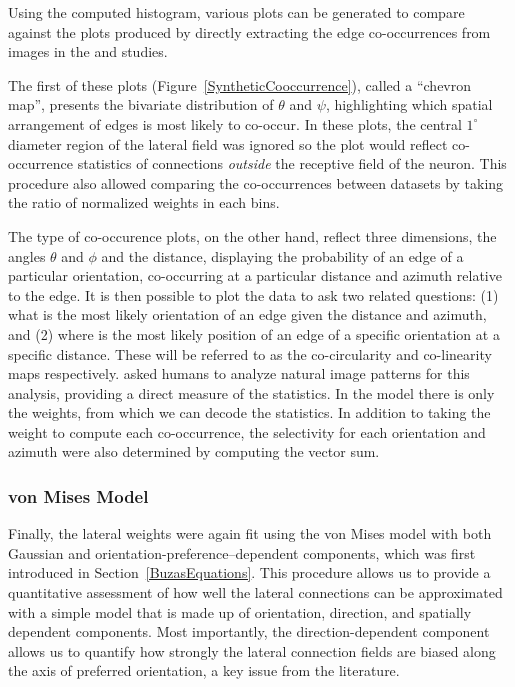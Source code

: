 Using the computed histogram, various plots can be generated to
compare against the plots produced by directly extracting the edge
co-occurrences from images in the \cite{Perrinet2015} and
\cite{Geisler2001} studies.

The first of these plots (Figure~\ref{SyntheticCooccurrence}), called
a ``chevron map'', presents the bivariate distribution of $\theta$ and
$\psi$, highlighting which spatial arrangement of edges is most likely
to co-occur. In these plots, the central $1^\circ$ diameter region of
the lateral field was ignored so the plot would reflect co-occurrence
statistics of connections \emph{outside} the receptive field of the
neuron. This procedure also allowed comparing the co-occurrences between
datasets by taking the ratio of normalized weights in each bins.

The \cite{Geisler2001} type of co-occurence plots, on the other hand,
reflect three dimensions, the angles $\theta$ and $\phi$ and the
distance, displaying the probability of an edge of a particular
orientation, co-occurring at a particular distance and azimuth
relative to the edge. It is then possible to plot the data to ask
two related questions: (1) what is the most likely orientation of an
edge given the distance and azimuth, and (2) where is the most likely
position of an edge of a specific orientation at a specific
distance. These will be referred to as the co-circularity and
co-linearity maps respectively. \cite{Geisler2001} asked humans to analyze
natural image patterns for this analysis, providing a direct measure
of the statistics. In the model there is only the weights, from which we can
decode the statistics. In addition to taking the weight to
compute each co-occurrence, the selectivity for each orientation and
azimuth were also determined by computing the vector sum.

\subsubsection*{von Mises Model}

Finally, the lateral weights were again fit using the von Mises model
with both Gaussian and orientation-preference--dependent components,
which was first introduced in Section~\ref{BuzasEquations}. This procedure
allows us to provide a quantitative assessment of how well the lateral
connections can be approximated with a simple model that is made up of
orientation, direction, and spatially dependent components. Most
importantly, the direction-dependent component allows us to quantify
how strongly the lateral connection fields are biased along the axis
of preferred orientation, a key issue from the literature.

